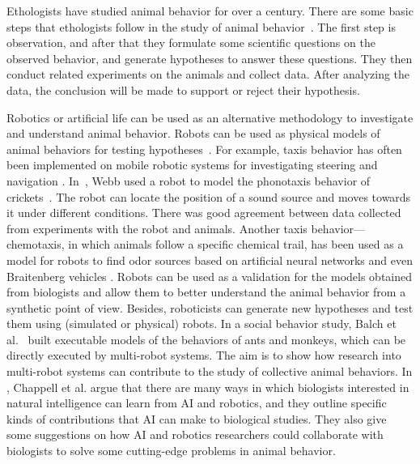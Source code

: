 Ethologists have studied animal behavior for over a century. There are some basic steps that ethologists follow in the study of animal behavior~\cite{camazine2003self}. The first step is observation, and after that they formulate some scientific questions on the observed behavior, and generate hypotheses to answer these questions. They then conduct related experiments on the animals and collect data. After analyzing the data, the conclusion will be made to support or reject their hypothesis.

Robotics or artificial life can be used as an alternative methodology to investigate and understand animal behavior. Robots can be used as physical models of animal behaviors for testing hypotheses~\citep{Barbara_2000, Meyer2008}. For example, taxis behavior has often been implemented on mobile robotic systems for investigating steering and navigation \cite{Ignacio2009}. In~\citep{Barbara_1995}, Webb used a robot to model the phonotaxis behavior of crickets~\citep{Popov:JCP:1997}. The robot can locate the position of a sound source and moves towards it under different conditions. There was good agreement between data collected from experiments with the robot and animals. Another taxis behavior---chemotaxis, in which animals follow a specific chemical trail, has been used as a model for robots to find odor sources based on artificial neural networks \cite{Farah_2002} and even Braitenberg vehicles \cite{Lilienthal_2003}. Robots can be used as a validation for the models obtained from biologists and allow them to better understand the animal behavior from a synthetic point of view. Besides, roboticists can generate new hypotheses and test them using (simulated or physical) robots. In a social behavior study, Balch et al.~\citep{Balch_2006} built executable models of the behaviors of ants and monkeys, which can be directly executed by multi-robot systems. The aim is to show how research into multi-robot systems can contribute to the study of collective animal behaviors. In \cite{Chappell_2010}, Chappell et al. argue that there are many ways in which biologists interested in natural intelligence can learn from AI and robotics, and they outline specific kinds of contributions that AI can make to biological studies. They also give some suggestions on how AI and robotics researchers could collaborate with biologists to solve some cutting-edge problems in animal behavior.

